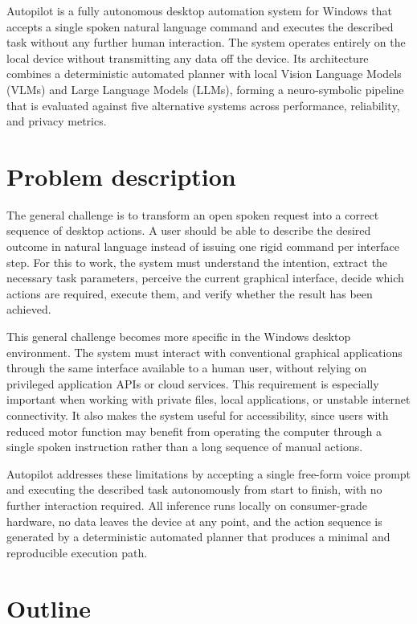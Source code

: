 Autopilot is a fully autonomous desktop automation system for Windows that accepts a single spoken natural language command and executes the described task without any further human interaction. The system operates entirely on the local device without transmitting any data off the device. Its architecture combines a deterministic automated planner with local Vision Language Models (VLMs) and Large Language Models (LLMs), forming a neuro-symbolic pipeline that is evaluated against five alternative systems across performance, reliability, and privacy metrics.

\section{Problem description}

The general challenge is to transform an open spoken request into a correct sequence of desktop actions. A user should be able to describe the desired outcome in natural language instead of issuing one rigid command per interface step. For this to work, the system must understand the intention, extract the necessary task parameters, perceive the current graphical interface, decide which actions are required, execute them, and verify whether the result has been achieved.

This general challenge becomes more specific in the Windows desktop environment. The system must interact with conventional graphical applications through the same interface available to a human user, without relying on privileged application APIs or cloud services. This requirement is especially important when working with private files, local applications, or unstable internet connectivity. It also makes the system useful for accessibility, since users with reduced motor function may benefit from operating the computer through a single spoken instruction rather than a long sequence of manual actions.

Autopilot addresses these limitations by accepting a single free-form voice prompt and executing the described task autonomously from start to finish, with no further interaction required. All inference runs locally on consumer-grade hardware, no data leaves the device at any point, and the action sequence is generated by a deterministic automated planner that produces a minimal and reproducible execution path.

\section{Outline}


